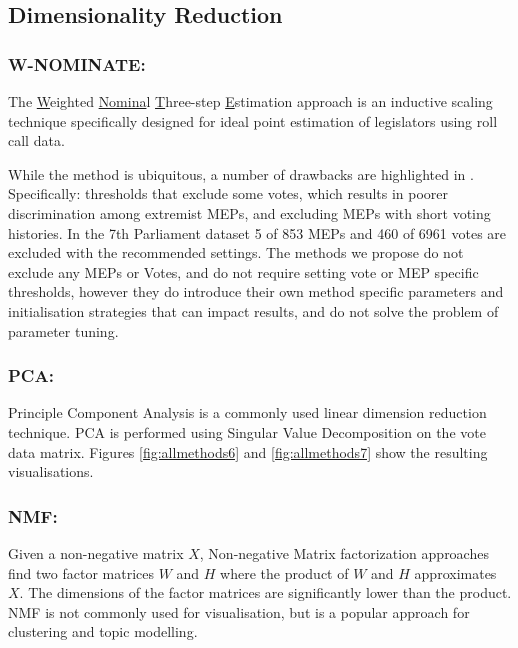 \documentclass{llncs}
\begin{document}
\subsection{Dimensionality Reduction}
\subsubsection {W-NOMINATE:} The \underline{W}eighted \underline{Nomina}l \underline{T}hree-step \underline{E}stimation approach \cite{wnominate} is an inductive scaling technique specifically designed for ideal point estimation of legislators using roll call data.

While the method is ubiquitous, a number of drawbacks are highlighted in \cite{clinton2003statistical}. Specifically: thresholds that exclude some votes, which results in poorer discrimination among extremist MEPs, and excluding MEPs with short voting histories. In the 7th Parliament dataset 5 of 853 MEPs and 460 of 6961 votes are excluded with the recommended settings. The methods we propose do not exclude any MEPs or Votes, and do not require setting vote or MEP specific thresholds, however they do introduce their own method specific parameters and initialisation strategies that can impact results, and do not solve the problem of parameter tuning.

\subsubsection{PCA:}
Principle Component Analysis \cite{Fodor02DRSurvey} is a commonly used linear dimension reduction technique. PCA is performed using Singular Value Decomposition on the vote data matrix. Figures \ref{fig:allmethods6} and \ref{fig:allmethods7} show the resulting visualisations.

\subsubsection{NMF:}
Given a non-negative matrix $X$, Non-negative Matrix factorization \cite{nmf1} approaches find two factor matrices $W$ and $H$ where the product of $W$ and $H$ approximates $X$. The dimensions of the factor matrices are significantly lower than the product. NMF is not commonly used for visualisation, but is a popular approach for clustering \cite{nmf} and topic modelling.
\end{document}
